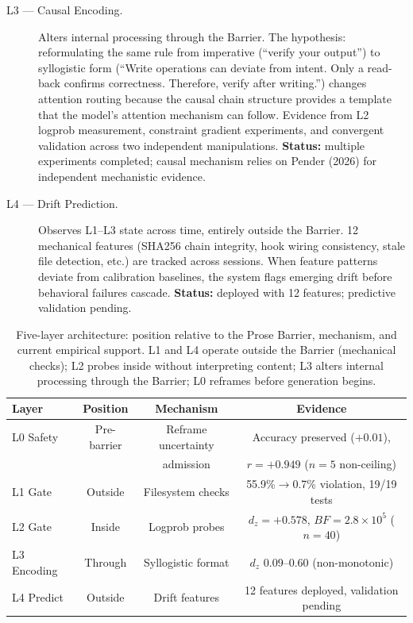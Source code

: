 \documentclass[11pt]{article}
\begin{document}
\begin{description}
\item[L3 --- Causal Encoding.] Alters internal processing through the Barrier.
  The hypothesis: reformulating the same rule from imperative (``verify your
  output'') to syllogistic form (``Write operations can deviate from intent.
  Only a read-back confirms correctness. Therefore, verify after writing.'')
  changes attention routing because the causal chain structure provides a
  template that the model's attention mechanism can follow. Evidence from L2
  logprob measurement, constraint gradient experiments, and convergent
  validation across two independent manipulations.
  \textbf{Status:} multiple experiments completed; causal mechanism relies on
  Pender (2026) for independent mechanistic evidence.

\item[L4 --- Drift Prediction.] Observes L1--L3 state across time, entirely
  outside the Barrier. 12 mechanical features (SHA256 chain integrity, hook
  wiring consistency, stale file detection, etc.) are tracked across sessions.
  When feature patterns deviate from calibration baselines, the system flags
  emerging drift before behavioral failures cascade.
  \textbf{Status:} deployed with 12 features; predictive validation pending.
\end{description}

\begin{table}[t]
\centering
\begin{tabular}{lccc}
\toprule
\textbf{Layer} & \textbf{Position} & \textbf{Mechanism} & \textbf{Evidence} \\
\midrule
L0 Safety  & Pre-barrier & Reframe uncertainty & Accuracy preserved ($+0.01$), \\
            &             & admission             & $r{=}+0.949$ ($n{=}5$ non-ceiling) \\
L1 Gate     & Outside     & Filesystem checks     & 55.9\%$\to$0.7\% violation, 19/19 tests \\
L2 Gate     & Inside      & Logprob probes        & $d_z{=}+0.578$, $BF{=}2.8{\times}10^5$ ($n{=}40$) \\
L3 Encoding & Through     & Syllogistic format    & $d_z$ 0.09--0.60 (non-monotonic) \\
L4 Predict  & Outside     & Drift features        & 12 features deployed, validation pending \\
\bottomrule
\end{tabular}
\caption{Five-layer architecture: position relative to the Prose Barrier,
mechanism, and current empirical support. L1 and L4 operate outside the
Barrier (mechanical checks); L2 probes inside without interpreting content;
L3 alters internal processing through the Barrier; L0 reframes before
generation begins.}
\label{tab:architecture}
\end{table}
\end{document}
